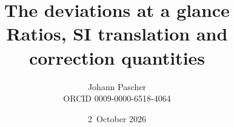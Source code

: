 \documentclass[11pt,a4paper]{report}
\title{The deviations at a glance\\[0.5em]
  \large Ratios, SI translation and correction quantities}
\date{2~October 2026}
\author{Johann Pascher\\\small ORCID 0009-0000-6518-4064}
\begin{document}
\renewcommand{\thechapter}{}
\renewcommand{\thesection}{\arabic{section}}
\maketitle
\tableofcontents

\end{document}
